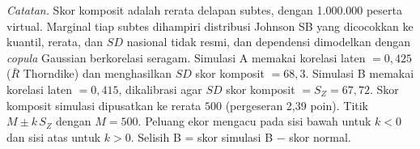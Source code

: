 \begin{table}[H]
    \centering
    \caption{Sensitivitas Persentil dan Skor Komposit terhadap Asumsi Normal dengan Marginal Johnson SB dan \textit{Copula} Gaussian}
    \label{tab:nonnormal_sim}
    \begin{spacing}{1.0}
    \end{spacing}
    \vspace{2mm}
    \begin{flushleft}
    \footnotesize\textit{Catatan.} Skor komposit adalah rerata delapan subtes, dengan 1.000.000 peserta virtual. Marginal tiap subtes dihampiri distribusi Johnson SB yang dicocokkan ke kuantil, rerata, dan $SD$ nasional tidak resmi, dan dependensi dimodelkan dengan \textit{copula} Gaussian berkorelasi seragam. Simulasi A memakai korelasi laten $= 0,425$ ($\bar{R}$ Thorndike) dan menghasilkan $SD$ skor komposit $= 68,3$. Simulasi B memakai korelasi laten $= 0,415$, dikalibrasi agar $SD$ skor komposit $= S_Z = 67,72$. Skor komposit simulasi dipusatkan ke rerata $500$ (pergeseran 2,39 poin). Titik $M \pm k\,S_Z$ dengan $M = 500$. Peluang ekor mengacu pada sisi bawah untuk $k<0$ dan sisi atas untuk $k>0$. Selisih B = skor simulasi B $-$ skor normal.
    \end{flushleft}
\end{table}
